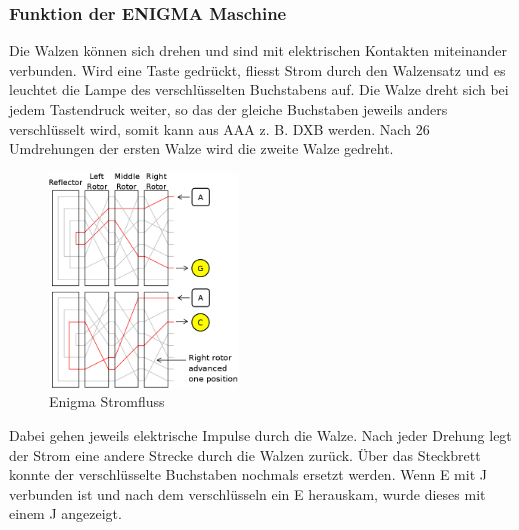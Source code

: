 \subsubsection{Funktion der ENIGMA Maschine}
Die Walzen können sich drehen und sind mit elektrischen Kontakten miteinander verbunden. Wird eine Taste gedrückt, fliesst Strom durch den Walzensatz und es leuchtet die Lampe des verschlüsselten Buchstabens auf. Die Walze dreht sich bei jedem Tastendruck weiter, so das der gleiche Buchstaben jeweils anders verschlüsselt wird, somit kann aus AAA z. B. DXB werden. Nach 26 Umdrehungen der ersten Walze wird die zweite Walze gedreht. \\
%
\begin{figure}[ht]
\begin{center}
\includegraphics[width=5cm]{images/Enigma-action.png}
\caption{Enigma Stromfluss}
\end{center}
\end{figure}
%
Dabei gehen jeweils elektrische Impulse durch die Walze. Nach jeder Drehung legt der Strom eine andere Strecke durch die Walzen zurück. 
Über das Steckbrett konnte der verschlüsselte Buchstaben nochmals ersetzt werden. Wenn E mit J verbunden ist und nach dem verschlüsseln ein E herauskam, wurde dieses mit einem J angezeigt. 
%
